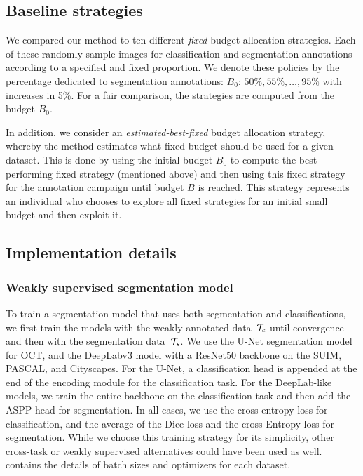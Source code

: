 \subsection{Baseline strategies} We compared our method to ten different \textit{fixed} budget allocation strategies. Each of these randomly sample images for classification and segmentation annotations according to a specified and fixed proportion. We denote these policies by the percentage dedicated to segmentation annotations: $B_0$: $50\%, 55\%, \ldots, 95\%$ with increases in 5\%. For a fair comparison, the strategies are computed from the budget $B_0$.

In addition, we consider an \textit{estimated-best-fixed} budget allocation strategy, whereby the method estimates what fixed budget should be used for a given dataset. This is done by using the initial budget $B_0$ to compute the best-performing fixed strategy (mentioned above) and then using this fixed strategy for the annotation campaign until budget $B$ is reached. This strategy represents an individual who chooses to explore all fixed strategies for an initial small budget and then exploit it. 

\subsection{Implementation details} 
\subsubsection{Weakly supervised segmentation model} To train a segmentation model that uses both segmentation and classifications, we first train the models with the weakly-annotated data~$\mathcal{T}_c$ until convergence and then with the segmentation data~$\mathcal{T}_s$. We use the U-Net segmentation model for  OCT, and the DeepLabv3 model with a ResNet50 backbone on the SUIM, PASCAL, and Cityscapes. For the U-Net, a classification head is appended at the end of the encoding module for the classification task. For the DeepLab-like models, we train the entire backbone on the classification task and then add the ASPP head for segmentation. In all cases, we use the cross-entropy loss for classification, and the average of the Dice loss and the cross-Entropy loss for segmentation. While we choose this training strategy for its simplicity, other cross-task or weakly supervised alternatives could have been used as well.  contains the details of batch sizes and optimizers for each dataset.

